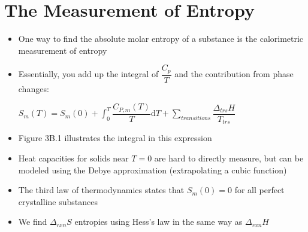 \documentclass[12pt, openany, letterpaper]{memoir}
\begin{document}
\section{The Measurement of Entropy}
\begin{itemize}
	\item One way to find the absolute molar entropy of a substance is the calorimetric measurement of entropy
	\item Essentially, you add up the integral of $\dfrac{C_p}{T}$ and the contribution from phase changes:
	
	$S_m(T) = S_m(0) + \displaystyle\int_0^T\dfrac{C_{P,m}(T)}{T}\mathrm{d}T + \displaystyle\sum\limits_{transitions}\dfrac{\Delta_{trs}H}{T_{trs}}$
	\item Figure 3B.1 illustrates the integral in this expression
	\item Heat capacities for solids near $T=0$ are hard to directly measure, but can be modeled using the Debye approximation (extrapolating a cubic function)
	\item The third law of thermodynamics states that $S_m(0) = 0$ for all perfect crystalline substances
	\item We find $\Delta_{rxn}S$ entropies using Hess's law in the same way as $\Delta_{rxn} H$
\end{itemize}
\end{document}
